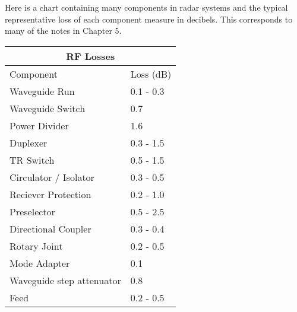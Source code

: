 \documentclass[12pt]{article}
\begin{document}
Here is a chart containing many components in radar systems and the typical representative loss of each component measure in decibels. This corresponds to many of the notes in Chapter 5. 
\begin{center}
    \begin{tabular}{ |p{5cm}|p{5cm}|}
        \hline
            \multicolumn{2}{|c|}{RF Losses} \\
        \hline
            Component & Loss (dB) \\
        \hline
            Waveguide Run & 0.1 - 0.3 \\
            Waveguide Switch & 0.7 \\
            Power Divider & 1.6 \\
            Duplexer & 0.3 - 1.5 \\
            TR Switch & 0.5 - 1.5 \\
            Circulator / Isolator & 0.3 - 0.5 \\
            Reciever Protection & 0.2 - 1.0 \\
            Preselector & 0.5 - 2.5 \\
            Directional Coupler & 0.3 - 0.4 \\
            Rotary Joint & 0.2 - 0.5 \\
            Mode Adapter & 0.1 \\
            Waveguide step attenuator & 0.8 \\
            Feed & 0.2 - 0.5 \\
        \hline
    \end{tabular}
\end{center}
\end{document}
